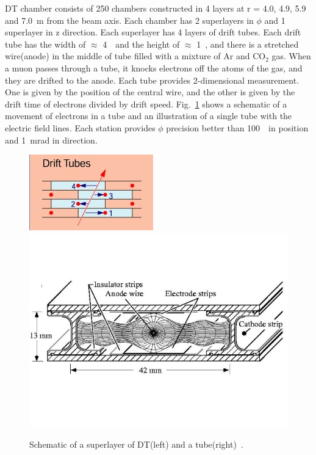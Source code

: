 DT chamber consists of 250 chambers constructed in 4 layers at r = 4.0, 4.9, 5.9 
and 7.0~m from the beam axis. Each chamber has 2 superlayers in $\phi$ and 
1 superlayer in z direction. Each superlayer has 4 layers of drift tubes. 
Each drift tube has the width of $\approx$ 4~\cm\ and the height of $\approx$ 1~\cm, 
and there is a stretched wire(anode) in the middle of tube filled with a mixture of 
Ar and $\textrm{CO}_2$ gas. When a muon passes through a tube, it knocks 
electrons off the atoms of the gas, and they are drifted to the anode.
Each tube provides 2-dimensional measurement. One is given by the position of 
the central wire, and the other is given by the drift time of electrons divided by
drift speed. Fig.~\ref{fig:muon_dt} shows a schematic of a 
movement of electrons in a tube and an illustration of a single tube with the
electric field lines. Each station provides $\phi$ precision better than 100~\um\ 
in position and 1~mrad in direction. 
%
\begin{figure}[h] 
\centering
\vspace{1cm}
\includegraphics[height=0.3\textwidth]{figures/DT.jpg} 
\includegraphics[height=0.3\textwidth]{figures/DT_onetube.jpg}
\caption{Schematic of a superlayer of DT(left) and a tube(right)~\cite{Maselli:1196170}.}
\label{fig:muon_dt} 
\end{figure} 

